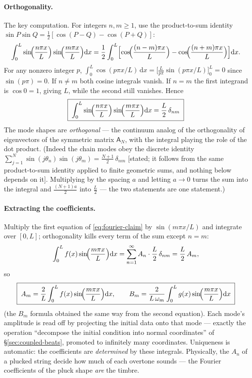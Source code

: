 \documentclass[11pt]{article}
\theoremstyle{plain}
\theoremstyle{definition}
\theoremstyle{remark}
\newcommand{\dd}{\mathrm{d}}
\newcommand{\mA}{\mathsf{A}}
\begin{document}
\paragraph{Orthogonality.}
The key computation. For integers $n,m \ge 1$, use the product-to-sum
identity $\sin P\sin Q = \tfrac12[\cos(P-Q) - \cos(P+Q)]$:
\begin{equation}
  \int_0^L \sin\!\Bigl(\frac{n\pi x}{L}\Bigr)\sin\!\Bigl(\frac{m\pi x}{L}\Bigr)\dd x
  = \frac12\int_0^L \Bigl[\cos\!\Bigl(\frac{(n-m)\pi x}{L}\Bigr)
   - \cos\!\Bigl(\frac{(n+m)\pi x}{L}\Bigr)\Bigr]\dd x .
\end{equation}
For any nonzero integer $p$,
$\int_0^L \cos(p\pi x/L)\,\dd x = \bigl[\tfrac{L}{p\pi}\sin(p\pi x/L)\bigr]_0^L
= 0$ since $\sin(p\pi) = 0$. If $n\neq m$ both cosine integrals vanish. If
$n = m$ the first integrand is $\cos 0 = 1$, giving $L$, while the second
still vanishes. Hence
\begin{equation}
  \boxed{\;
  \int_0^L \sin\!\Bigl(\frac{n\pi x}{L}\Bigr)\sin\!\Bigl(\frac{m\pi x}{L}\Bigr)\dd x
  = \frac{L}{2}\,\delta_{nm}
  \;}
  \label{eq:orthogonality}
\end{equation}
The mode shapes are \emph{orthogonal} --- the continuum analog of the
orthogonality of eigenvectors of the symmetric matrix $\mA_N$, with the
integral playing the role of the dot product. (Indeed the chain modes obey
the discrete identity
$\sum_{j=1}^{N}\sin(j\theta_n)\sin(j\theta_m) = \tfrac{N+1}{2}\,\delta_{nm}$
[stated; it follows from the same product-to-sum identity applied to
finite geometric sums, and nothing below depends on it]. Multiplying by the spacing $a$ and letting $a\to0$ turns the sum into
the integral and $\tfrac{(N+1)a}{2}$ into $\tfrac{L}{2}$ --- the two
statements are one statement.)

\paragraph{Extracting the coefficients.}
Multiply the first equation of \eqref{eq:fourier-claim} by
$\sin(m\pi x/L)$ and integrate over $[0,L]$; orthogonality kills every term
of the sum except $n=m$:
\begin{equation}
  \int_0^L f(x)\sin\!\Bigl(\frac{m\pi x}{L}\Bigr)\dd x
  = \sum_{n=1}^\infty A_n \cdot \frac{L}{2}\,\delta_{nm}
  = \frac{L}{2}\,A_m ,
\end{equation}
so
\begin{equation}
  \boxed{\;
  A_m = \frac{2}{L}\int_0^L f(x)\sin\!\Bigl(\frac{m\pi x}{L}\Bigr)\dd x,
  \qquad
  B_m = \frac{2}{L\,\omega_m}\int_0^L g(x)\sin\!\Bigl(\frac{m\pi x}{L}\Bigr)\dd x
  \;}
\end{equation}
(the $B_m$ formula obtained the same way from the second equation). Each
mode's amplitude is read off by projecting the initial data onto that mode
--- exactly the operation ``decompose the initial condition into normal
coordinates'' of \S\ref{sec:coupled-beats}, promoted to infinitely many
coordinates. Uniqueness is automatic: the coefficients are \emph{determined}
by these integrals. Physically, the $A_n$ of a plucked string decide how
much of each overtone sounds --- the Fourier coefficients of the pluck shape
\emph{are} the timbre.
\end{document}

